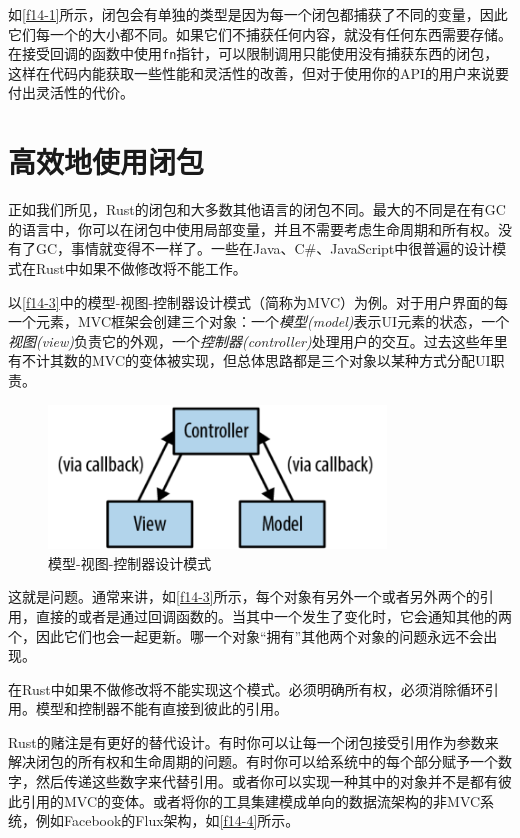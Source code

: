 如\autoref{f14-1}所示，闭包会有单独的类型是因为每一个闭包都捕获了不同的变量，因此它们每一个的大小都不同。如果它们不捕获任何内容，就没有任何东西需要存储。在接受回调的函数中使用\texttt{fn}指针，可以限制调用只能使用没有捕获东西的闭包，这样在代码内能获取一些性能和灵活性的改善，但对于使用你的API的用户来说要付出灵活性的代价。

\section{高效地使用闭包}

正如我们所见，Rust的闭包和大多数其他语言的闭包不同。最大的不同是在有GC的语言中，你可以在闭包中使用局部变量，并且不需要考虑生命周期和所有权。没有了GC，事情就变得不一样了。一些在Java、C\#、JavaScript中很普遍的设计模式在Rust中如果不做修改将不能工作。

以\autoref{f14-3}中的模型-视图-控制器设计模式（简称为MVC）为例。对于用户界面的每一个元素，MVC框架会创建三个对象：一个\emph{模型(model)}表示UI元素的状态，一个\emph{视图(view)}负责它的外观，一个\emph{控制器(controller)}处理用户的交互。过去这些年里有不计其数的MVC的变体被实现，但总体思路都是三个对象以某种方式分配UI职责。

\begin{figure}[htbp]
    \centering
    \includegraphics[width=0.8\textwidth]{../img/f14-3.png}
    \caption{模型-视图-控制器设计模式}
    \label{f14-3}
\end{figure}

这就是问题。通常来讲，如\autoref{f14-3}所示，每个对象有另外一个或者另外两个的引用，直接的或者是通过回调函数的。当其中一个发生了变化时，它会通知其他的两个，因此它们也会一起更新。哪一个对象“拥有”其他两个对象的问题永远不会出现。

在Rust中如果不做修改将不能实现这个模式。必须明确所有权，必须消除循环引用。模型和控制器不能有直接到彼此的引用。

Rust的赌注是有更好的替代设计。有时你可以让每一个闭包接受引用作为参数来解决闭包的所有权和生命周期的问题。有时你可以给系统中的每个部分赋予一个数字，然后传递这些数字来代替引用。或者你可以实现一种其中的对象并不是都有彼此引用的MVC的变体。或者将你的工具集建模成单向的数据流架构的非MVC系统，例如Facebook的Flux架构，如\autoref{f14-4}所示。

